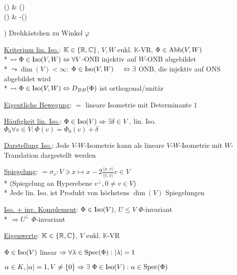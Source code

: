 \begin{items}
\begin{smallmatrix}
			\cos(\varphi) & \sin(\varphi) \\
			\sin(\varphi) & -\cos(\varphi)
		\end{smallmatrix} \right) \) Drehkästchen zu Winkel \( \varphi \)
	\item \underline{Kriterium lin. Iso.}: \( \mathbb{K} \in \{ \mathbb{R}, \mathbb{C} \} \), \( V,W \) eukl. \( \mathbb{K} \)-VR, \( \Phi \in \text{Abb}(V,W) \)
		\\*
		\( \leadsto \Phi \in \text{Iso}(V,W) \Leftrightarrow \forall V \)-ONB injektiv auf \( W \)-ONB abgebildet
		\\*
		\( \leadsto \dim(V) < \infty \): \( \Phi \in \text{Iso}(V,W) \\* \phantom{xx} \Leftrightarrow \exists \) ONB, die injektiv auf ONS abgebildet wird
		\\*
		\phantom{xx} \( \leadsto \Phi \in \text{Iso}(V,W) \Leftrightarrow D_{BB}(\Phi) \) ist orthogonal/unitär

	\item \underline{Eigentliche Bewegung}: \( = \) lineare Isometrie mit Determinante \( 1 \)

	\item \underline{Häufigkeit lin. Iso.}: \( \Phi \in \text{Iso}(V) \Rightarrow \exists \delta \in V \), lin. Iso. \( \Phi_0 \forall v \in V: \Phi(v) = \Phi_0(v)+\delta \)

	\item \underline{Darstellung Iso.}: Jede \( V \)-\( W \)-Isometrie kann als lineare \( V \)-\( W \)-Isometrie mit \( W \)-Translation dargestellt werden

	\item \underline{Spiegelung}: \( = \sigma_v: V \ni x \mapsto x-2\tfrac{\langle x,v \rangle}{\langle v,v \rangle}v \in V \)
		\\*
		(Spiegelung an Hyperebene \( v^\perp, 0 \neq v \in V \))
		\\*
		Jede lin. Iso. ist Produkt von höchstens \( \dim(V) \) Spiegelungen

	\item \underline{Iso. + inv. Komplement}: \( \Phi \in \text{Iso}(V) \), \( U \leq V \) \( \Phi \)-invariant
		\\*
		\( \Rightarrow U^\perp \) \( \Phi \)-invariant

	\item \underline{Eigenwerte}: \( \mathbb{K} \in \{ \mathbb{R}, \mathbb{C} \} \), \( V \) eukl. \( \mathbb{K} \)-VR
		\begin{enumeration}
			\item \( \Phi \in \text{Iso}(V) \) linear \( \Rightarrow \forall \lambda \in \text{Spec}(\Phi): |\lambda| = 1 \) 
			\item \( \alpha \in K, |\alpha| = 1, V \neq \{ 0 \} \Rightarrow \exists \ \Phi \in \text{Iso}(V): \alpha \in \text{Spec}(\Phi) \)
		\end{enumeration}


\end{items}
